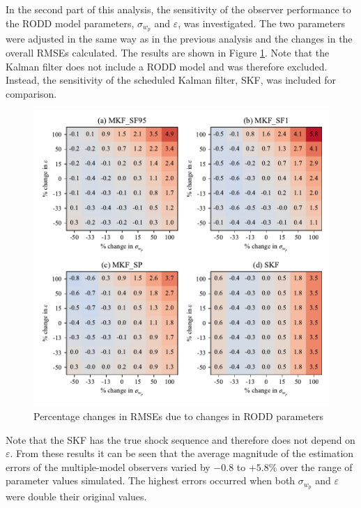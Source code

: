 In the second part of this analysis, the sensitivity of the observer performance to the \gls{RODD} model parameters, $\sigma_{w_p}$ and $\varepsilon$, was investigated. The two parameters were adjusted in the same way as in the previous analysis and the changes in the overall \gls{RMSE}s calculated. The results are shown in Figure \ref{fig:grind1-obs-sim-sens-rod-y-est}. Note that the Kalman filter does not include a \gls{RODD} model and was therefore excluded. Instead, the sensitivity of the scheduled Kalman filter, \gls{SKF}, was included for comparison.
\begin{figure}[htp]
	\centering
	\includegraphics[width=15cm]{images/rod_obs_sim_sens_rod_4obs_RMSE_y_est.pdf}
	\caption{Percentage changes in RMSEs due to changes in \gls{RODD} parameters}
	\label{fig:grind1-obs-sim-sens-rod-y-est}
\end{figure}
Note that the \gls{SKF} has the true shock sequence and therefore does not depend on $\varepsilon$. From these results it can be seen that the average magnitude of the estimation errors of the multiple-model observers varied by $-0.8$ to $+5.8$\% over the range of parameter values simulated. The highest errors occurred when both $\sigma_{w_p}$ and $\varepsilon$ were double their original values.

